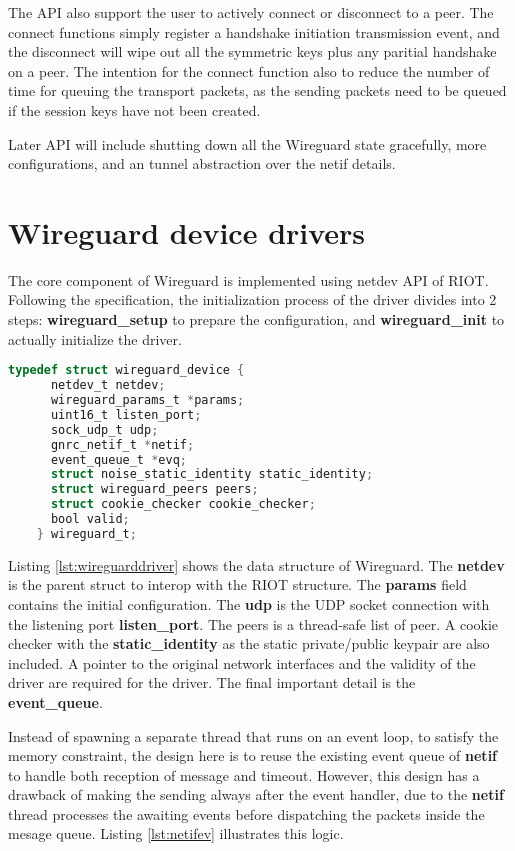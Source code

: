   The API also support the user to actively connect or disconnect to a peer. The connect
  functions simply register a handshake initiation transmission event, and the disconnect
  will wipe out all the symmetric keys plus any paritial handshake on a peer. The intention
  for the connect function also to reduce the number of time for queuing the transport packets,
  as the sending packets need to be queued if the session keys have not been created. 

  Later API will include shutting down all the Wireguard state gracefully, more configurations, and
  an tunnel abstraction over the netif details.

\section{Wireguard device drivers}
  The core component of Wireguard is implemented using netdev API of RIOT. Following the specification,
  the initialization process of the driver divides into 2 steps: \textbf{wireguard{\_}setup} to prepare
  the configuration, and \textbf{wireguard{\_}init} to actually initialize the driver. 
  
  \begin{lstlisting}[caption = Wireguard driver,language=C, label={lst:wireguarddriver}]
    typedef struct wireguard_device {
      netdev_t netdev;
      wireguard_params_t *params;
      uint16_t listen_port;
      sock_udp_t udp;
      gnrc_netif_t *netif;
      event_queue_t *evq;
      struct noise_static_identity static_identity;
      struct wireguard_peers peers;
      struct cookie_checker cookie_checker;
      bool valid;
    } wireguard_t;

  \end{lstlisting}

  Listing \ref{lst:wireguarddriver} shows the data structure of Wireguard. The \textbf{netdev}
  is the parent struct to interop with the RIOT structure. The \textbf{params} field
  contains the initial configuration. The \textbf{udp} is the UDP socket connection with
  the listening port \textbf{listen{\_}port}. The peers is a thread-safe list of peer. 
  A cookie checker with the \textbf{static{\_}identity} as the static private/public keypair are
  also included. A pointer to the original network interfaces and the validity of the driver
  are required for the driver. The final important detail is the \textbf{event{\_}queue}.

  Instead of spawning a separate thread that runs on an event loop, to satisfy the memory constraint, 
  the design here is to reuse the existing event queue of \textbf{netif} to handle both reception 
  of message and timeout. However, this design has a drawback of making the sending always after the 
  event handler, due to the \textbf{netif} thread processes the awaiting events before dispatching
  the packets inside the mesage queue. Listing
  \ref{lst:netifev} illustrates this logic.

